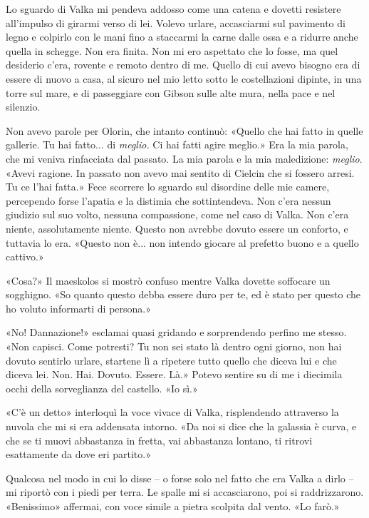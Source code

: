 Lo sguardo di Valka mi pendeva addosso come una catena e dovetti
resistere all'impulso di girarmi verso di lei. Volevo urlare,
accasciarmi sul pavimento di legno e colpirlo con le mani fino a
staccarmi la carne dalle ossa e a ridurre anche quella in schegge. Non
era finita. Non mi ero aspettato che lo fosse, ma quel desiderio c'era,
rovente e remoto dentro di me. Quello di cui avevo bisogno era di essere
di nuovo a casa, al sicuro nel mio letto sotto le costellazioni dipinte,
in una torre sul mare, e di passeggiare con Gibson sulle alte mura,
nella pace e nel silenzio.

Non avevo parole per Olorin, che intanto continuò: «Quello che hai fatto
in quelle gallerie. Tu hai fatto... di \emph{meglio.} Ci hai fatti agire
meglio.» Era la mia parola, che mi veniva rinfacciata dal passato. La
mia parola e la mia maledizione: \emph{meglio}. «Avevi ragione. In
passato non avevo mai sentito di Cielcin che si fossero arresi. Tu ce
l'hai fatta.» Fece scorrere lo sguardo sul disordine delle mie camere,
percependo forse l'apatia e la distimia che sottintendeva. Non c'era
nessun giudizio sul suo volto, nessuna compassione, come nel caso di
Valka. Non c'era niente, assolutamente niente. Questo non avrebbe dovuto
essere un conforto, e tuttavia lo era. «Questo non è... non intendo
giocare al prefetto buono e a quello cattivo.»

«Cosa?» Il maeskolos si mostrò confuso mentre Valka dovette soffocare un
sogghigno. «So quanto questo debba essere duro per te, ed è stato per
questo che ho voluto informarti di persona.»

«No! Dannazione!» esclamai quasi gridando e sorprendendo perfino me
stesso. «Non capisci. Come potresti? Tu non sei stato là dentro ogni
giorno, non hai dovuto sentirlo urlare, startene lì a ripetere tutto
quello che diceva lui e che diceva lei. Non. Hai. Dovuto. Essere. Là.»
Potevo sentire su di me i diecimila occhi della sorveglianza del
castello. «Io sì.»

«C'è un detto» interloquì la voce vivace di Valka, risplendendo
attraverso la nuvola che mi si era addensata intorno. «Da noi si dice
che la galassia è curva, e che se ti muovi abbastanza in fretta, vai
abbastanza lontano, ti ritrovi esattamente da dove eri partito.»

Qualcosa nel modo in cui lo disse -- o forse solo nel fatto che era
Valka a dirlo -- mi riportò con i piedi per terra. Le spalle mi si
accasciarono, poi si raddrizzarono. «Benissimo» affermai, con voce
simile a pietra scolpita dal vento. «Lo farò.»

